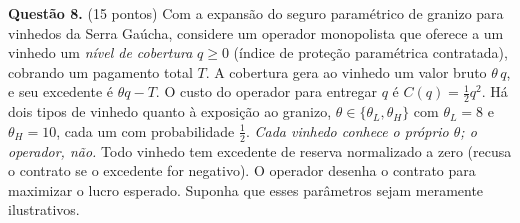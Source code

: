 
\textbf{Questão 8.} (15 pontos) Com a expans\~ao do seguro param\'etrico de granizo para vinhedos da Serra Ga\'ucha, considere um operador monopolista que oferece a um vinhedo um \emph{n\'ivel de cobertura} $q \ge 0$ (\'indice de prote\c{c}\~ao param\'etrica contratada), cobrando um pagamento total $T$. A cobertura gera ao vinhedo um valor bruto $\theta\,q$, e seu excedente \'e $\theta q - T$. O custo do operador para entregar $q$ \'e $C(q) = \tfrac{1}{2}q^{2}$. H\'a dois tipos de vinhedo quanto \`a exposi\c{c}\~ao ao granizo, $\theta \in \{\theta_L,\theta_H\}$ com $\theta_L = 8$ e $\theta_H = 10$, cada um com probabilidade $\tfrac{1}{2}$. \emph{Cada vinhedo conhece o pr\'oprio $\theta$; o operador, n\~ao.} Todo vinhedo tem excedente de reserva normalizado a zero (recusa o contrato se o excedente for negativo). O operador desenha o contrato para maximizar o lucro esperado. Suponha que esses par\^ametros sejam meramente ilustrativos.

